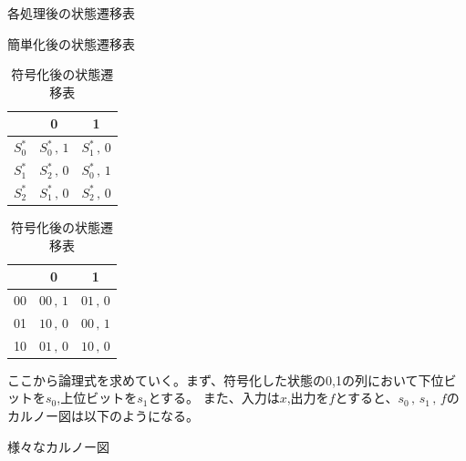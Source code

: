 \documentclass{jsarticle}
\begin{document}
\begin{description}
\begin{description}
            \begin{table}[H]
                \centering
                \caption{各処理後の状態遷移表}
                \label{tab3}
                \begin{minipage}{0.4\columnwidth}
                    \centering
                    \caption{簡単化後の状態遷移表}
                    \begin{tabular}{|c|c|c|} \hline
                        & 0 & 1 \\ \hline
                        $S_0^*$ & $S_0^* \,,\, 1$ & $S_1^* \,,\, 0$ \\ \hline
                        $S_1^*$ & $S_2^* \,,\, 0$ & $S_0^* \,,\, 1$ \\ \hline
                        $S_2^*$ & $S_1^* \,,\, 0$ & $S_2^* \,,\, 0$ \\ \hline
                    \end{tabular}
                \end{minipage}
                \begin{minipage}{0.4\columnwidth}
                    \centering
                    \caption{符号化後の状態遷移表}
                    \begin{tabular}{|c|c|c|} \hline
                        & 0 & 1 \\ \hline
                        00 & $00 \,,\, 1$ & $01 \,,\, 0$ \\ \hline
                        01 & $10 \,,\, 0$ & $00 \,,\, 1$ \\ \hline
                        10 & $01 \,,\, 0$ & $10 \,,\, 0$ \\ \hline
                    \end{tabular}
                \end{minipage}
            \end{table}
            ここから論理式を求めていく。まず、符号化した状態の0,1の列において下位ビットを$s_0$,上位ビットを$s_1$とする。
            また、入力は$x$,出力を$f$とすると、$s_0 \,,\, s_1 \,,\, f$のカルノー図は以下のようになる。
            \begin{table}
                \centering
                \caption{様々なカルノー図}
                \label{tab4}
                \begin{minipage}
                    
                \end{minipage}
            \end{table}

      \end{description}
  \end{description}
\end{document}

